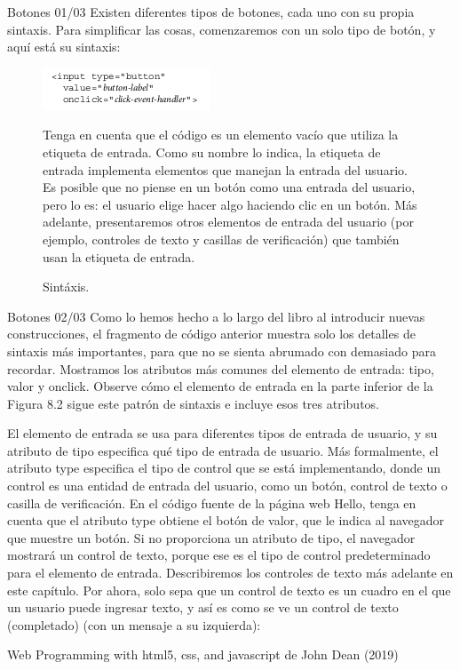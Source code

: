 \begin{frame}{Botones 01/03}
\justifying
Existen diferentes tipos de botones, cada uno con su propia sintaxis. Para simplificar las cosas, comenzaremos con un solo tipo de botón, y aquí está su sintaxis:
\begin{figure}[H]
\centering
\includegraphics[scale=0.5]{Section_Files/images/Sec01/03.png}
\caption{Sintáxis.}
Tenga en cuenta que el código es un elemento vacío que utiliza la etiqueta de entrada. Como su nombre lo indica, la etiqueta de entrada implementa elementos que manejan la entrada del usuario. Es posible que no piense en un botón como una entrada del usuario, pero lo es: el usuario elige hacer algo haciendo clic en un botón. Más adelante, presentaremos otros elementos de entrada del usuario (por ejemplo, controles de texto y casillas de verificación) que también usan la etiqueta de entrada.
\end{figure}

\end{frame}

\begin{frame}{Botones 02/03}
\justifying
Como lo hemos hecho a lo largo del libro al introducir nuevas construcciones, el fragmento de código anterior muestra solo los detalles de sintaxis más importantes, para que no se sienta abrumado con demasiado para recordar. Mostramos los atributos más comunes del elemento de entrada: tipo, valor y onclick. Observe cómo el elemento de entrada en la parte inferior de la Figura 8.2 sigue este patrón de sintaxis e incluye esos tres atributos.

El elemento de entrada se usa para diferentes tipos de entrada de usuario, y su atributo de tipo especifica qué tipo de entrada de usuario. Más formalmente, el atributo type especifica el tipo de control que se está implementando, donde un control es una entidad de entrada del usuario, como un botón, control de texto o casilla de verificación. En el código fuente de la página web Hello, tenga en cuenta que el atributo type obtiene el botón de valor, que le indica al navegador que muestre un botón. Si no proporciona un atributo de tipo, el navegador mostrará un control de texto, porque ese es el tipo de control predeterminado para el elemento de entrada. Describiremos los controles de texto más adelante en este capítulo. Por ahora, solo sepa que un control de texto es un cuadro en el que un usuario puede ingresar texto, y así es como se ve un control de texto (completado) (con un mensaje a su izquierda):


{\tiny Web Programming with html5, css, and javascript de John Dean (2019)}
\end{frame}

